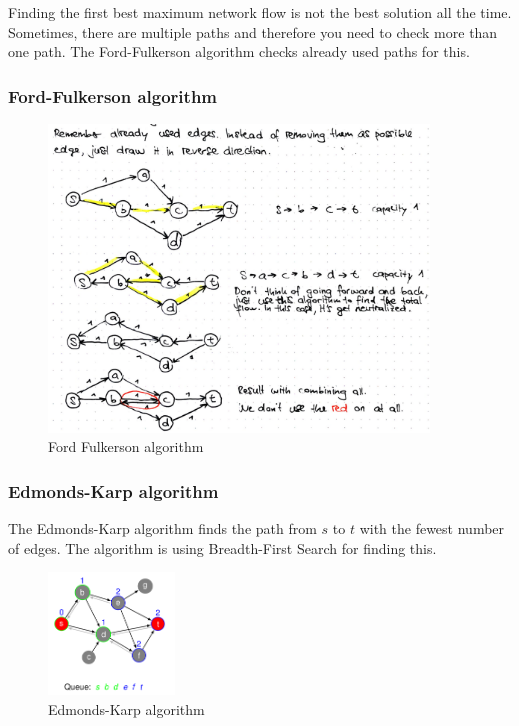 Finding the first best maximum network flow is not the best solution all the time. Sometimes, there are multiple paths and therefore you need to check more than one path. The Ford-Fulkerson algorithm checks already used paths for this.

\subsubsection{Ford-Fulkerson algorithm}
\begin{figure}[H]
\centering
\includegraphics[width=0.9\textwidth]{figures/ford-fulkerson.png}
\caption{Ford Fulkerson algorithm}
\end{figure}

\subsubsection{Edmonds-Karp algorithm}
The Edmonds-Karp algorithm finds the path from $s$ to $t$ with the fewest number of edges. The algorithm is using Breadth-First Search for finding this.

\begin{figure}[H]
\centering
\includegraphics[width=0.3\textwidth]{figures/Edmonds-Karp.png}
\caption{Edmonds-Karp algorithm}
\end{figure}

